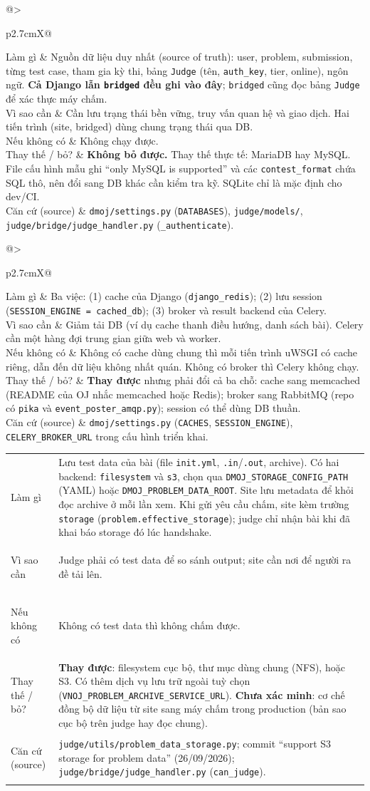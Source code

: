 \documentclass[11pt,a4paper]{article}
\makeatletter
\renewcommand{\c}[1]{\texttt{#1}}
\newcommand{\comp}[6]{%
\begin{tcolorbox}[enhanced,breakable,colback=white,colframe=black!55,boxrule=0.5pt,arc=2pt,
  title={\textbf{#1}},fonttitle=\large,left=4pt,right=4pt,top=3pt,bottom=3pt]
\begin{tabularx}{\linewidth}{@{}>{\bfseries\raggedright}p{2.7cm}X@{}}
Làm gì & #2 \\[2pt]
Vì sao cần & #3 \\[2pt]
Nếu không có & #4 \\[2pt]
Thay thế / bỏ? & #5 \\[2pt]
Căn cứ (source) & \small #6 \\
\end{tabularx}
\end{tcolorbox}}
\makeatother
\begin{document}
\comp{B1. MySQL / MariaDB}
{Nguồn dữ liệu duy nhất (source of truth): user, problem, submission, từng test case, tham gia kỳ thi, bảng \c{Judge} (tên, \c{auth\_key}, tier, online), ngôn ngữ. \textbf{Cả Django lẫn \c{bridged} đều ghi vào đây}; \c{bridged} cũng đọc bảng \c{Judge} để xác thực máy chấm.}
{Cần lưu trạng thái bền vững, truy vấn quan hệ và giao dịch. Hai tiến trình (site, bridged) dùng chung trạng thái qua DB.}
{Không chạy được.}
{\textbf{Không bỏ được.} Thay thế thực tế: MariaDB hay MySQL. File cấu hình mẫu ghi ``only MySQL is supported'' và các \c{contest\_format} chứa SQL thô, nên đổi sang DB khác cần kiểm tra kỹ. SQLite chỉ là mặc định cho dev/CI.}
{\c{dmoj/settings.py} (\c{DATABASES}), \c{judge/models/}, \c{judge/bridge/judge\_handler.py} (\c{\_authenticate}).}

\comp{B2. Redis}
{Ba việc: (1) cache của Django (\c{django\_redis}); (2) lưu session (\c{SESSION\_ENGINE = cached\_db}); (3) broker và result backend của Celery.}
{Giảm tải DB (ví dụ cache thanh điều hướng, danh sách bài). Celery cần một hàng đợi trung gian giữa web và worker.}
{Không có cache dùng chung thì mỗi tiến trình uWSGI có cache riêng, dẫn đến dữ liệu không nhất quán. Không có broker thì Celery không chạy.}
{\textbf{Thay được} nhưng phải đổi cả ba chỗ: cache sang memcached (README của OJ nhắc memcached hoặc Redis); broker sang RabbitMQ (repo có \c{pika} và \c{event\_poster\_amqp.py}); session có thể dùng DB thuần.}
{\c{dmoj/settings.py} (\c{CACHES}, \c{SESSION\_ENGINE}), \c{CELERY\_BROKER\_URL} trong cấu hình triển khai.}

\comp{B3. Kho dữ liệu đề (Problem data storage)}
{Lưu test data của bài (file \c{init.yml}, \c{.in}/\c{.out}, archive). Có hai backend: \c{filesystem} và \c{s3}, chọn qua \c{DMOJ\_STORAGE\_CONFIG\_PATH} (YAML) hoặc \c{DMOJ\_PROBLEM\_DATA\_ROOT}. Site lưu metadata để khỏi đọc archive ở mỗi lần xem. Khi gửi yêu cầu chấm, site kèm trường \c{storage} (\c{problem.effective\_storage}); judge chỉ nhận bài khi đã khai báo storage đó lúc handshake.}
{Judge phải có test data để so sánh output; site cần nơi để người ra đề tải lên.}
{Không có test data thì không chấm được.}
{\textbf{Thay được}: filesystem cục bộ, thư mục dùng chung (NFS), hoặc S3. Có thêm dịch vụ lưu trữ ngoài tuỳ chọn (\c{VNOJ\_PROBLEM\_ARCHIVE\_SERVICE\_URL}). \textbf{Chưa xác minh}: cơ chế đồng bộ dữ liệu từ site sang máy chấm trong production (bản sao cục bộ trên judge hay đọc chung).}
{\c{judge/utils/problem\_data\_storage.py}; commit ``support S3 storage for problem data'' (26/09/2026); \c{judge/bridge/judge\_handler.py} (\c{can\_judge}).}
\end{document}
